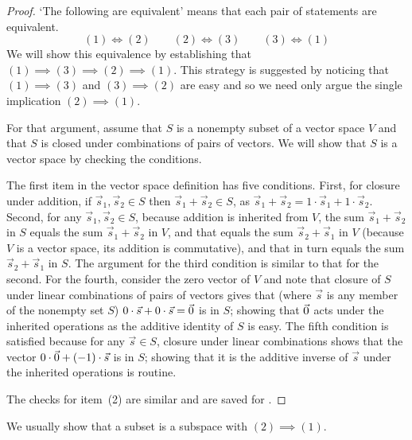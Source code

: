 \begin{proof}
`The following are equivalent' means that each pair of 
statements are equivalent.
\begin{equation*}
  (1)\!\iff\!(2)
  \qquad
  (2)\!\iff\!(3)
  \qquad
  (3)\!\iff\!(1)
\end{equation*}
We will show this equivalence by establishing that
\( (1)\implies (3)\implies (2)\implies (1)\).
This strategy is suggested by noticing that
\( (1)\implies (3) \) and \( (3)\implies (2) \) are easy and so we need only
argue the single implication \( (2)\implies (1) \).

For that argument, assume that \( S \) is a nonempty subset of a vector space
$V$ and that $S$ is closed under combinations of pairs of vectors.
We will show that $S$ is a vector space by checking the conditions.

The first item in the vector space definition has five conditions.
First, for closure under addition, if
\( \vec{s}_1,\vec{s}_2\in S \) then \( \vec{s}_1+\vec{s}_2\in S \),
as \( \vec{s}_1+\vec{s}_2=1\cdot\vec{s}_1+1\cdot\vec{s}_2 \).
Second, for any \( \vec{s}_1,\vec{s}_2\in S \), because addition
is inherited from \( V \), the sum \( \vec{s}_1+\vec{s}_2 \)
in \( S \) equals the sum \( \vec{s}_1+\vec{s}_2 \)
in \( V \), and that equals the sum \( \vec{s}_2+\vec{s}_1 \) in
\( V \) (because $V$ is a vector space, its addition is commutative), 
and that in turn equals the sum \( \vec{s}_2+\vec{s}_1 \) in \( S \).
The argument for the third condition is similar to that for the second.
For the fourth, consider the zero vector of \( V \) and note that 
closure of $S$ under linear combinations of pairs of vectors gives that 
(where \( \vec{s} \) is any member of the nonempty set \( S \))
\( 0\cdot\vec{s}+0\cdot\vec{s}=\vec{0} \) is in $S$;
showing that \( \vec{0} \) acts under the inherited operations as the additive
identity of \( S \) is easy.
The fifth condition is satisfied because for any \( \vec{s}\in S \),
closure under linear combinations shows that the vector
\( 0\cdot\vec{0}+(-1)\cdot\vec{s} \) is in \( S \); showing that it is the
additive inverse of \( \vec{s} \) under the inherited operations is
routine.

The checks for item~(2) are similar and are saved for
.
\end{proof}

We usually show that a subset is a subspace with \( (2)\implies (1) \).

